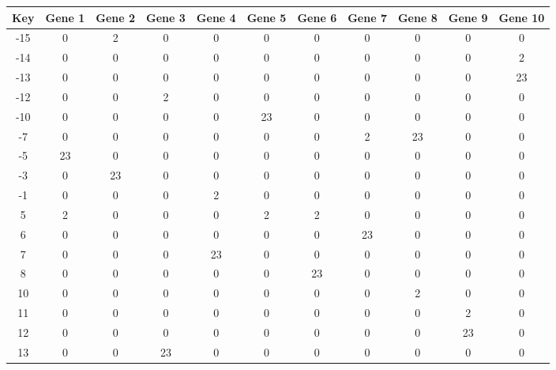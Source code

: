 \begin{tabular}{|c|c|c|c|c|c|c|c|c|c|c|}
\hline
Key & Gene 1 & Gene 2 & Gene 3 & Gene 4 & Gene 5 & Gene 6 & Gene 7 & Gene 8 & Gene 9 & Gene 10 \\
\hline
-15 & 0 & 2 & 0 & 0 & 0 & 0 & 0 & 0 & 0 & 0 \\
-14 & 0 & 0 & 0 & 0 & 0 & 0 & 0 & 0 & 0 & 2 \\
-13 & 0 & 0 & 0 & 0 & 0 & 0 & 0 & 0 & 0 & 23 \\
-12 & 0 & 0 & 2 & 0 & 0 & 0 & 0 & 0 & 0 & 0 \\
-10 & 0 & 0 & 0 & 0 & 23 & 0 & 0 & 0 & 0 & 0 \\
-7 & 0 & 0 & 0 & 0 & 0 & 0 & 2 & 23 & 0 & 0 \\
-5 & 23 & 0 & 0 & 0 & 0 & 0 & 0 & 0 & 0 & 0 \\
-3 & 0 & 23 & 0 & 0 & 0 & 0 & 0 & 0 & 0 & 0 \\
-1 & 0 & 0 & 0 & 2 & 0 & 0 & 0 & 0 & 0 & 0 \\
5 & 2 & 0 & 0 & 0 & 2 & 2 & 0 & 0 & 0 & 0 \\
6 & 0 & 0 & 0 & 0 & 0 & 0 & 23 & 0 & 0 & 0 \\
7 & 0 & 0 & 0 & 23 & 0 & 0 & 0 & 0 & 0 & 0 \\
8 & 0 & 0 & 0 & 0 & 0 & 23 & 0 & 0 & 0 & 0 \\
10 & 0 & 0 & 0 & 0 & 0 & 0 & 0 & 2 & 0 & 0 \\
11 & 0 & 0 & 0 & 0 & 0 & 0 & 0 & 0 & 2 & 0 \\
12 & 0 & 0 & 0 & 0 & 0 & 0 & 0 & 0 & 23 & 0 \\
13 & 0 & 0 & 23 & 0 & 0 & 0 & 0 & 0 & 0 & 0 \\
\hline
\end{tabular}